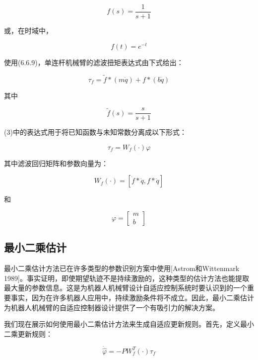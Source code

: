 \documentclass[12pt,a4paper]{ctexart}
\begin{document}
\begin{equation}
f(s) = \frac{1}{s + 1}
\end{equation}

或，在时域中，

\begin{equation}
f(t) = e^{-t}
\end{equation}

使用(6.6.9)，单连杆机械臂的滤波扭矩表达式由下式给出：

\begin{equation}
\tau_f = \tilde{f} * (m\dot{q}) + f * (b\dot{q})
\end{equation}

其中

\begin{equation}
\tilde{f}(s) = \frac{s}{s + 1}
\end{equation}

(3)中的表达式用于将已知函数与未知常数分离成以下形式：

\begin{equation}
\tau_f = W_f(\cdot)\varphi
\end{equation}

其中滤波回归矩阵和参数向量为：

\begin{equation}
W_f(\cdot) = [\dot{f} * \dot{q}, f * \dot{q}]
\end{equation}

和

\begin{equation}
\varphi = \begin{bmatrix} m \\ b \end{bmatrix}
\end{equation}

\subsection*{最小二乘估计}

最小二乘估计方法已在许多类型的参数识别方案中使用[Astrom和Wittenmark 1989]。事实证明，即使期望轨迹不是持续激励的，这种类型的估计方法也能提取最大量的参数信息。这是为机器人机械臂设计自适应控制系统时要认识到的一个重要事实，因为在许多机器人应用中，持续激励条件将不成立。因此，最小二乘估计为机器人机械臂的自适应控制器设计提供了一个有吸引力的解决方案。

我们现在展示如何使用最小二乘估计方法来生成自适应更新规则。首先，定义最小二乘更新规则：

\begin{equation}\label{eq:least-squares}
\dot{\hat{\varphi}} = -P W_f^T(\cdot)\tau_f
\end{equation}
\end{document}
